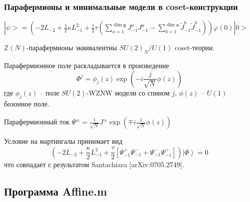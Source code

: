 \documentclass[pdftex]{beamer}
\newcommand{\gf}{\mathfrak{g}}
\newcommand{\af}{\mathfrak{a}}
\theoremstyle{definition} \newtheorem{Def}{Определение}
\begin{document}
\begin{frame}
  \frametitle{Парафермионы и минимальные модели в coset-конструкции}
$|\psi>=\left(-2L_{-2}+\frac{1}{2}\kappa L_{-1}^{2}+\frac{1}{2}\tau \left(\displaystyle{\sum_{a=1}^{\dim\gf}}J^{a}_{-1}J^{a}_{-1}-\displaystyle{\sum_{b=1}^{\dim\af}}\tilde{J}^{b}_{-1}\tilde{J}^{b}_{-1}\right)\right) 
\varphi(0)|0>$

  $\mathbb{Z}(N)$-парафермионы эквивалентны $SU(2)_{N}/U(1)$ coset-теории.
  
  Парафермионное поле раскладывается в произведение
  \begin{equation*}
    \Phi^{j}=\phi_{j}(z) \exp\left( -i \frac{j}{\sqrt{N}}\phi(z)\right)
  \end{equation*}
  где $\phi_{j}(z)$ -- поле $SU(2)$-WZNW модели со спином $j$, $\phi(z)$ -- $U(1)$ бозонное поле.
  
  Парафермионный ток $ \Psi^{\pm}=\frac{1}{\sqrt{N}} J^{\pm}\exp\left(\mp i \frac{1}{\sqrt{N}}\phi(z)\right)$

  Условие на мартингалы принимает вид
  \begin{equation*}
    \left(-2 L_{-2}+\frac{\kappa}{2}L_{-1}^{2}+\frac{\tau}{2}\left[\Psi^{+}_{-1}\Psi^{-}_{-1}+\Psi^{-}_{-1}\Psi^{+}_{-1}\right]\right) \left|\Phi\right>=0
  \end{equation*}
  что совпадает с результатом Santachiara [arXiv:0705.2749].
\end{frame}

\subsection{Программа Affine.m}
\label{sec:-affine.m}
\end{document}
